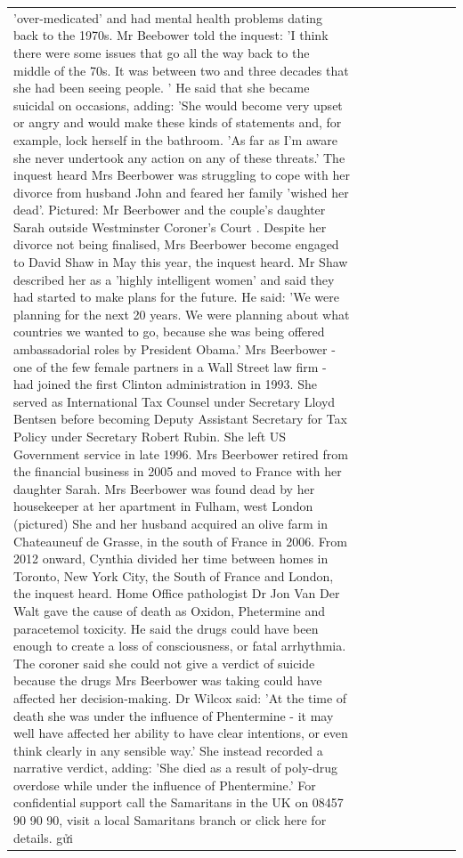 \begin{table}[H]
\begin{tabular}{lllrlllll}
'over-medicated' and had mental health problems dating back to the 1970s. Mr Beebower told the inquest: 'I think there were some issues that go all the way back to the middle of the 70s. It was between two and three decades that she had been seeing people. ' He said that she became suicidal on occasions, adding: 'She would become very upset or angry and would make these kinds of statements and, for example, lock herself in the bathroom. 'As far as I'm aware she never undertook any action on any of these threats.' The inquest heard Mrs Beerbower was struggling to cope with her divorce from husband John and feared her family 'wished her dead'. Pictured: Mr Beerbower and the couple's daughter Sarah outside Westminster Coroner's Court . Despite her divorce not being finalised, Mrs Beerbower become engaged to David Shaw in May this year, the inquest heard. Mr Shaw described her as a 'highly intelligent women' and said they had started to make plans for the future. He said: 'We were planning for the next 20 years. We were planning about what countries we wanted to go, because she was being offered ambassadorial roles by President Obama.' Mrs Beerbower - one of the few female partners in a Wall Street law firm - had joined the first Clinton administration in 1993. She served as International Tax Counsel under Secretary Lloyd Bentsen before becoming Deputy Assistant Secretary for Tax Policy under Secretary Robert Rubin. She left US Government service in late 1996. Mrs Beerbower retired from the financial business in 2005 and moved to France with her daughter Sarah. Mrs Beerbower was found dead by her housekeeper at her apartment in Fulham, west London (pictured) She and her husband acquired an olive farm in Chateauneuf de Grasse, in the south of France in 2006. From 2012 onward, Cynthia divided her time between homes in Toronto, New York City, the South of France and London, the inquest heard. Home Office pathologist Dr Jon Van Der Walt gave the cause of death as Oxidon, Phetermine and paracetemol toxicity. He said the drugs could have been enough to create a loss of consciousness, or fatal arrhythmia. The coroner said she could not give a verdict of suicide because the drugs Mrs Beerbower was taking could have affected her decision-making. Dr Wilcox said: 'At the time of death she was under the influence of Phentermine - it may well have affected her ability to have clear intentions, or even think clearly in any sensible way.' She instead recorded a narrative verdict, adding: 'She died as a result of poly-drug overdose while under the influence of Phentermine.' For confidential support call the Samaritans in the UK on 08457 90 90 90, visit a local Samaritans branch or click here for details. gửi \\

\end{tabular}
\end{table}
